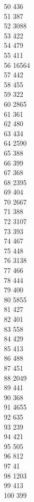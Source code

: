 { 50	436 \\
 51	387 \\
 52	3088 \\
 53	422 \\
 54	479 \\
 55	411 \\
 56	16564 \\
 57	442 \\
 58	455 \\
 59	322 \\
 60	2865 \\
 61	361 \\
 62	480 \\
 63	434 \\
 64	2590 \\
 65	388 \\
 66	399 \\
 67	368 \\
 68	2395 \\
 69	404 \\
 70	2667 \\
 71	388 \\
 72	3107 \\
 73	393 \\
 74	467 \\
 75	448 \\
 76	3138 \\
 77	466 \\
 78	444 \\
 79	400 \\
 80	5855 \\
 81	427 \\
 82	401 \\
 83	558 \\
 84	429 \\
 85	413 \\
 86	488 \\
 87	451 \\
 88	2049 \\
 89	441 \\
 90	368 \\
 91	4655 \\
 92	635 \\
 93	239 \\
 94	421 \\
 95	505 \\
 96	812 \\
 97	41 \\
 98	1203 \\
 99	413 \\
 100	399 \\
}
